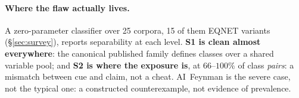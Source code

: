 \paragraph{Where the flaw actually lives.} A zero-parameter classifier over 25 corpora, 15 of them EQNET variants (\S\ref{sec:survey}), reports separability at each level. \textbf{S1 is clean almost everywhere}: the canonical published family \citep{allamanis2017learning, gangwar2023semantic, zheng2025egen} defines classes over a shared variable pool; and \textbf{S2 is where the exposure is}, at $66$--$100\%$ of class \emph{pairs}: a mismatch between cue and claim, not a cheat. AI~Feynman \citep{udrescu2020ai} is the severe case, not the typical one: a constructed counterexample, not evidence of prevalence.

